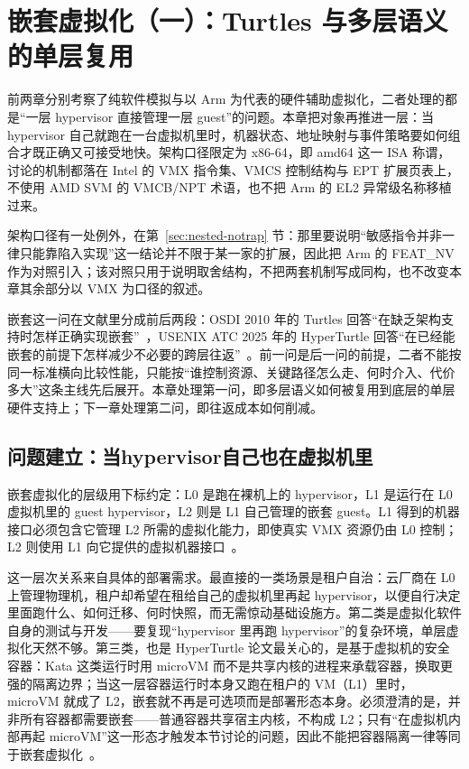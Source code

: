 \chapter{嵌套虚拟化（一）：Turtles 与多层语义的单层复用}\label{sec:nested}


前两章分别考察了纯软件模拟与以 Arm 为代表的硬件辅助虚拟化，二者处理的都是“一层 hypervisor 直接管理一层 guest”的问题。本章把对象再推进一层：当 hypervisor 自己就跑在一台虚拟机里时，机器状态、地址映射与事件策略要如何组合才既正确又可接受地快。架构口径限定为 x86-64，即 amd64 这一 ISA 称谓，讨论的机制都落在 Intel 的 VMX 指令集、VMCS 控制结构与 EPT 扩展页表上，不使用 AMD SVM 的 VMCB/NPT 术语，也不把 Arm 的 EL2 异常级名称移植过来。

架构口径有一处例外，在第~\ref{sec:nested-notrap} 节：那里要说明“敏感指令并非一律只能靠陷入实现”这一结论并不限于某一家的扩展，因此把 Arm 的 FEAT\_NV 作为对照引入；该对照只用于说明取舍结构，不把两套机制写成同构，也不改变本章其余部分以 VMX 为口径的叙述。

嵌套这一问在文献里分成前后两段：OSDI 2010 年的 Turtles 回答“在缺乏架构支持时怎样正确实现嵌套”~\cite{source7}，USENIX ATC 2025 年的 HyperTurtle 回答“在已经能嵌套的前提下怎样减少不必要的跨层往返”~\cite{source8}。前一问是后一问的前提，二者不能按同一标准横向比较性能，只能按“谁控制资源、关键路径怎么走、何时介入、代价多大”这条主线先后展开。本章处理第一问，即多层语义如何被复用到底层的单层硬件支持上；下一章处理第二问，即往返成本如何削减。

\section{问题建立：当hypervisor自己也在虚拟机里}\label{sec:nested-problem}

嵌套虚拟化的层级用下标约定：L0 是跑在裸机上的 hypervisor，L1 是运行在 L0 虚拟机里的 guest hypervisor，L2 则是 L1 自己管理的嵌套 guest。L1 得到的机器接口必须包含它管理 L2 所需的虚拟化能力，即使真实 VMX 资源仍由 L0 控制；L2 则使用 L1 向它提供的虚拟机器接口~\cite{source7,source8}。

这一层次关系来自具体的部署需求。最直接的一类场景是租户自治：云厂商在 L0 上管理物理机，租户却希望在租给自己的虚拟机里再起 hypervisor，以便自行决定里面跑什么、如何迁移、何时快照，而无需惊动基础设施方。第二类是虚拟化软件自身的测试与开发——要复现“hypervisor 里再跑 hypervisor”的复杂环境，单层虚拟化天然不够。第三类，也是 HyperTurtle 论文最关心的，是基于虚拟机的安全容器：Kata 这类运行时用 microVM 而不是共享内核的进程来承载容器，换取更强的隔离边界；当这一层容器运行时本身又跑在租户的 VM（L1）里时，microVM 就成了 L2，嵌套就不再是可选项而是部署形态本身。必须澄清的是，并非所有容器都需要嵌套——普通容器共享宿主内核，不构成 L2；只有“在虚拟机内部再起 microVM”这一形态才触发本节讨论的问题，因此不能把容器隔离一律等同于嵌套虚拟化~\cite{source8}。

